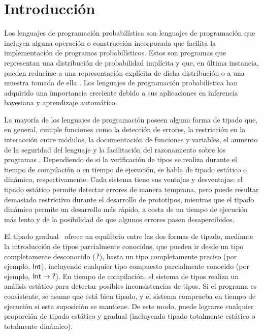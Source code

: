 \chapter{Introducción}

Los lenguajes de programación probabilística son lenguajes de
programación que incluyen alguna operación o construcción incorporada
que facilita la implementación de programas probabilísticos. Estos son
programas que representan una distribución de probabilidad implícita y
que, en última instancia, pueden reducirse a una representación
explícita de dicha distribución o a una muestra tomada de ella
\citep{prob-prog}. Los lenguajes de programación probabilística han
adquirido una importancia creciente debido a sus aplicaciones en
inferencia bayesiana y aprendizaje automático.

La mayoría de los lenguajes de programación poseen alguna forma de
tipado que, en general, cumple funciones como la detección de errores,
la restricción en la interacción entre módulos, la documentación de
funciones y variables, el aumento de la seguridad del lenguaje y la
facilitación del razonamiento sobre los programas
\citep{pierce}. Dependiendo de si la verificación de tipos se realiza
durante el tiempo de compilación o en tiempo de ejecución, se habla de
tipado estático o dinámico, respectivamente. Cada sistema tiene sus
ventajas y desventajas: el tipado estático permite detectar errores de
manera temprana, pero puede resultar demasiado restrictivo durante el
desarrollo de prototipos, mientras que el tipado dinámico permite un
desarrollo más rápido, a costa de un tiempo de ejecución más lento y
de la posibilidad de que algunos errores pasen desapercibidos.

El tipado gradual~\citep{gt} ofrece un equilibrio entre las dos
formas de tipado, mediante la introducción de tipos parcialmente
conocidos, que pueden ir desde un tipo completamente desconocido
($\mathord{\text{\sffamily ?}}$), hasta un tipo completamente preciso (por ejemplo, $\mathord{\text{\sffamily Int}}$),
incluyendo cualquier tipo compuesto parcialmente conocido (por
ejemplo, $\mathord{\text{\sffamily Int}} \to \mathord{\text{\sffamily ?}}$). En tiempo de compilación, el sistema de
tipos realiza un análisis estático para detectar posibles
inconsistencias de tipos. Si el programa es consistente, se asume que
está bien tipado, y el sistema comprueba en tiempo de ejecución si
esta suposición se mantiene. De este modo, puede lograrse cualquier
proporción de tipado estático y gradual (incluyendo tipado totalmente
estático o totalmente dinámico).

